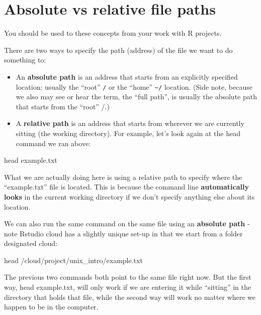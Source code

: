 \documentclass[
]{book}
\newenvironment{Shaded}{\begin{snugshade}}{\end{snugshade}}
\newcommand{\FunctionTok}[1]{\textcolor[rgb]{0.00,0.00,0.00}{#1}}
\newcommand{\NormalTok}[1]{#1}
\begin{document}
\hypertarget{absolute-vs-relative-file-paths}{%
\section{Absolute vs relative file paths}\label{absolute-vs-relative-file-paths}}

You should be used to these concepts from your work with R projects.

There are two ways to specify the path (address) of the file we want to do something to:

\begin{itemize}
\item
  An \textbf{absolute path} is an address that starts from an explicitly specified location: usually the ``root'' \texttt{/} or the ``home'' \texttt{\textasciitilde{}/} location. (Side note, because we also may see or hear the term, the ``full path'', is usually the absolute path that starts from the ``root'' /.)
\item
  A \textbf{relative path} is an address that starts from wherever we are currently sitting (the working directory). For example, let's look again at the head command we ran above:
\end{itemize}

\begin{Shaded}
\begin{Highlighting}[]
    \FunctionTok{head}\NormalTok{ example.txt}
\end{Highlighting}
\end{Shaded}

What we are actually doing here is using a relative path to specify where the ``example.txt'' file is located. This is because the command line \textbf{automatically looks} in the current working directory if we don't specify anything else about its location.

We can also run the same command on the same file using an \textbf{absolute path} - note Rstudio cloud has a slightly unique set-up in that we start from a folder designated cloud:

\begin{Shaded}
\begin{Highlighting}[]
    \FunctionTok{head}\NormalTok{ /cloud/project/unix\_intro/example.txt}
\end{Highlighting}
\end{Shaded}

The previous two commands both point to the same file right now. But the first way, head example.txt, will only work if we are entering it while ``sitting'' in the directory that holds that file, while the second way will work no matter where we happen to be in the computer.
\end{document}

